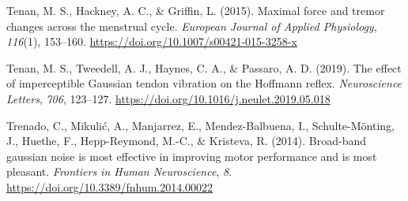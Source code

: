 \documentclass[]{cik}%
\newlength{\cslhangindent}
\newlength{\cslentryspacingunit} %
\newenvironment{CSLReferences}[2] %
 {%
  \setlength{\parindent}{0pt}
  \ifodd #1
  \let\oldpar\par
  \def\par{\hangindent=\cslhangindent\oldpar}
  \fi
  \setlength{\parskip}{#2\cslentryspacingunit}
 }%
 {}
\begin{document}
\begin{CSLReferences}{1}{0}
\leavevmode{}%
Tenan, M. S., Hackney, A. C., \& Griffin, L. (2015). Maximal force and
tremor changes across the menstrual cycle. \emph{European Journal of
Applied Physiology}, \emph{116}(1), 153--160.
\url{https://doi.org/10.1007/s00421-015-3258-x}

\leavevmode{}%
Tenan, M. S., Tweedell, A. J., Haynes, C. A., \& Passaro, A. D. (2019).
The effect of imperceptible Gaussian tendon vibration on the Hoffmann
reflex. \emph{Neuroscience Letters}, \emph{706}, 123--127.
\url{https://doi.org/10.1016/j.neulet.2019.05.018}

\leavevmode{}%
Trenado, C., Mikulić, A., Manjarrez, E., Mendez-Balbuena, I.,
Schulte-Mönting, J., Huethe, F., Hepp-Reymond, M.-C., \& Kristeva, R.
(2014). Broad-band gaussian noise is most effective in improving motor
performance and is most pleasant. \emph{Frontiers in Human
Neuroscience}, \emph{8}. \url{https://doi.org/10.3389/fnhum.2014.00022}

\end{CSLReferences}
\end{document}

